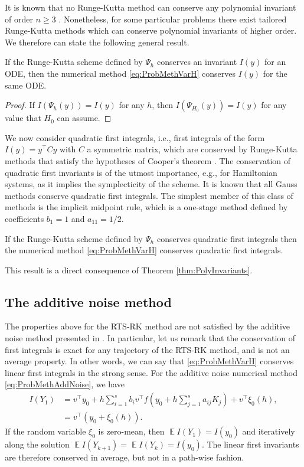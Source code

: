 \documentclass{siamart1116}
\numberwithin{theorem}{section}
\newcommand{\E}{\operatorname{\mathbb{E}}}
\newcommand{\sksum}{{\textstyle\sum}}
\begin{document}
It is known that no Runge-Kutta method can conserve any polynomial invariant of order $n \geq 3$ \cite{HLW06}. Nonetheless, for some particular problems there exist tailored Runge-Kutta methods which can conserve polynomial invariants of higher order. We therefore can state the following general result.
\begin{theorem}\label{thm:PolyInvariants} If the Runge-Kutta scheme defined by $\Psi_h$ conserves an invariant $I(y)$ for an ODE, then the numerical method \eqref{eq:ProbMethVarH} conserves $I(y)$ for the same ODE.
\end{theorem}
\begin{proof} If $I(\Psi_h(y)) = I(y)$ for any $h$, then $I(\Psi_{H_0}(y)) = I(y)$ for any value that $H_0$ can assume.
\end{proof}

We now consider quadratic first integrals, i.e., first integrals of the form $I(y) = y^\top C y$ with $C$ a symmetric matrix, which are conserved by Runge-Kutta methods that satisfy the hypotheses of Cooper's theorem \cite{HLW06}. The conservation of quadratic first invariants is of the utmost importance, e.g., for Hamiltonian systems, as it implies the symplecticity of the scheme. It is known \cite{HLW06} that all Gauss methods conserve quadratic first integrals. The simplest member of this class of methods is the implicit midpoint rule, which is a one-stage method defined by coefficients $b_1 = 1$ and $a_{11} = 1/2$.
\begin{corollary}\label{thm:QuadraticInvariants} If the Runge-Kutta scheme defined by $\Psi_h$ conserves quadratic first integrals then the numerical method \eqref{eq:ProbMethVarH} conserves quadratic first integrals.
\end{corollary}
This result is a direct consequence of Theorem \ref{thm:PolyInvariants}.

\subsection{The additive noise method}\label{sec:GeomPropAdd} The properties above for the RTS-RK method are not satisfied by the additive noise method presented in \cite{CGS16}. In particular, let us remark that the conservation of first integrals is exact for any trajectory of the RTS-RK method, and is not an average property. In other words, we can say that \eqref{eq:ProbMethVarH} conserves linear first integrals in the strong sense. For the additive noise numerical method \eqref{eq:ProbMethAddNoise}, we have
\begin{equation}
	\begin{aligned}
	I(Y_1) &= v^\top  y_0 + h \sksum_{i=1}^s b_iv^\top  f(y_0 + h\sksum_{j=1}^{s} a_{ij}K_j) + v^\top  \xi_0(h), \\
	&= v^\top  (y_0 + \xi_0(h)).
	\end{aligned}
\end{equation}
If the random variable $\xi_0$ is zero-mean, then $\E I(Y_1) = I(y_0)$ and iteratively along the solution $\E I(Y_{k+1}) = \E I(Y_k) = I(y_0)$. The linear first invariants are therefore conserved in average, but not in a path-wise fashion.
\end{document}
